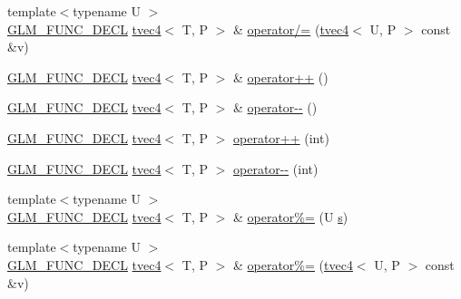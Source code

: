 \begin{DoxyCompactItemize}
\item 
{\footnotesize template$<$typename U $>$ }\\\hyperlink{setup_8hpp_ab2d052de21a70539923e9bcbf6e83a51}{G\+L\+M\+\_\+\+F\+U\+N\+C\+\_\+\+D\+E\+CL} \hyperlink{structglm_1_1detail_1_1tvec4}{tvec4}$<$ T, P $>$ \& \hyperlink{structglm_1_1detail_1_1tvec4_a2a1dd4b855a28388c59c44cc72c932c7}{operator/=} (\hyperlink{structglm_1_1detail_1_1tvec4}{tvec4}$<$ U, P $>$ const \&v)
\item 
\hyperlink{setup_8hpp_ab2d052de21a70539923e9bcbf6e83a51}{G\+L\+M\+\_\+\+F\+U\+N\+C\+\_\+\+D\+E\+CL} \hyperlink{structglm_1_1detail_1_1tvec4}{tvec4}$<$ T, P $>$ \& \hyperlink{structglm_1_1detail_1_1tvec4_aaa93930bcde2580185a474e508508ed2}{operator++} ()
\item 
\hyperlink{setup_8hpp_ab2d052de21a70539923e9bcbf6e83a51}{G\+L\+M\+\_\+\+F\+U\+N\+C\+\_\+\+D\+E\+CL} \hyperlink{structglm_1_1detail_1_1tvec4}{tvec4}$<$ T, P $>$ \& \hyperlink{structglm_1_1detail_1_1tvec4_a207d975fb868347e3b1e320c71e8beeb}{operator-\/-\/} ()
\item 
\hyperlink{setup_8hpp_ab2d052de21a70539923e9bcbf6e83a51}{G\+L\+M\+\_\+\+F\+U\+N\+C\+\_\+\+D\+E\+CL} \hyperlink{structglm_1_1detail_1_1tvec4}{tvec4}$<$ T, P $>$ \hyperlink{structglm_1_1detail_1_1tvec4_a60d572f73f76dbdedd6b1a164f8aacaa}{operator++} (int)
\item 
\hyperlink{setup_8hpp_ab2d052de21a70539923e9bcbf6e83a51}{G\+L\+M\+\_\+\+F\+U\+N\+C\+\_\+\+D\+E\+CL} \hyperlink{structglm_1_1detail_1_1tvec4}{tvec4}$<$ T, P $>$ \hyperlink{structglm_1_1detail_1_1tvec4_a880ec39f85acc9bbac0fe842670bec57}{operator-\/-\/} (int)
\item 
{\footnotesize template$<$typename U $>$ }\\\hyperlink{setup_8hpp_ab2d052de21a70539923e9bcbf6e83a51}{G\+L\+M\+\_\+\+F\+U\+N\+C\+\_\+\+D\+E\+CL} \hyperlink{structglm_1_1detail_1_1tvec4}{tvec4}$<$ T, P $>$ \& \hyperlink{structglm_1_1detail_1_1tvec4_acaef893b94a3beafa931256d381efb42}{operator\%=} (U \hyperlink{structglm_1_1detail_1_1tvec4_a82cbced4cbd070056c5acbc1d4d4906f}{s})
\item 
{\footnotesize template$<$typename U $>$ }\\\hyperlink{setup_8hpp_ab2d052de21a70539923e9bcbf6e83a51}{G\+L\+M\+\_\+\+F\+U\+N\+C\+\_\+\+D\+E\+CL} \hyperlink{structglm_1_1detail_1_1tvec4}{tvec4}$<$ T, P $>$ \& \hyperlink{structglm_1_1detail_1_1tvec4_a9ab6bbc0aa973f884a5d4e95230fddba}{operator\%=} (\hyperlink{structglm_1_1detail_1_1tvec4}{tvec4}$<$ U, P $>$ const \&v)
\item 

\end{DoxyCompactItemize}
